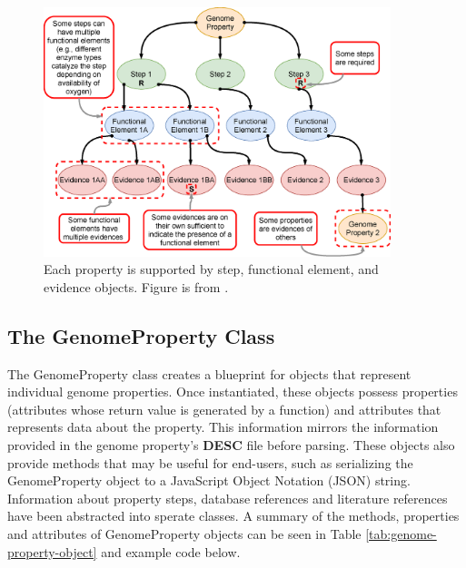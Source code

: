 \begin{figure}[!ht]
  \centering
	\includegraphics[width=0.90\textwidth]{media/Figure_1B.eps}
	 \caption{Each property is supported by step, functional element, and evidence objects. Figure is from \cite{bergstrand2019pygenprop}.}
	 \label{fig:property}
\end{figure}

\subsection{The GenomeProperty Class} \label{genome-property-class}

The GenomeProperty class creates a blueprint for objects that represent individual genome properties. Once instantiated, these objects possess properties (attributes whose return value is generated by a function) and attributes that represents data about the property. This information mirrors the information provided in the genome property's \textbf{DESC} file before parsing. These objects also provide methods that may be useful for end-users, such as serializing the GenomeProperty object to a JavaScript Object Notation (JSON) \cite{bray2014rfc} string. Information about property steps, database references and literature references have been abstracted into sperate classes. A summary of the methods, properties and attributes of GenomeProperty objects can be seen in Table \ref{tab:genome-property-object} and example code below.

